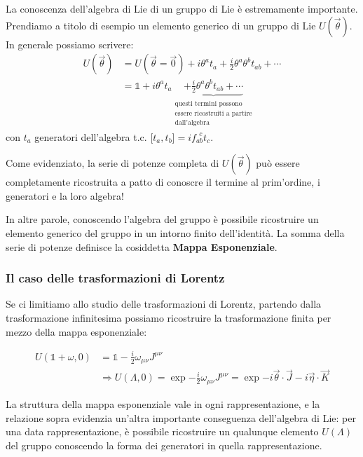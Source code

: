 \documentclass[../main.tex]{subfiles}
\begin{document}
La conoscenza dell'algebra di Lie di un gruppo di Lie è estremamente importante. Prendiamo a titolo di esempio un elemento generico di un gruppo di Lie $U(\Vec\theta)$. In generale possiamo scrivere:
\begin{align*}
    U(\Vec\theta) &= U(\Vec\theta=\Vec0) + i\theta^a t_a + \frac{i}{2}\theta^a \theta^b t_{ab} + \cdots\\
    &=\mathbb 1 + i\theta^a t_a \underbrace{+ \frac{i}{2}\theta^a \theta^b t_{ab} + \cdots}_{\substack{\text{questi termini possono}\\\text{essere ricostruiti a partire}\\\text{dall'algebra}}}
\end{align*}
con \(t_a\) generatori dell'algebra t.c. \(\big[t_a,t_b\big] = if_{ab}^{~~c}t_c\).

Come evidenziato, la serie di potenze completa di $U(\Vec\theta)$ può essere completamente ricostruita a patto di conoscre il termine al prim'ordine, i generatori e la loro algebra!

In altre parole, conoscendo l'algebra del gruppo è possibile ricostruire un elemento generico del gruppo in un intorno finito dell'identità. La somma della serie di potenze definisce la cosiddetta \textbf{Mappa Esponenziale}.

\subsubsection{Il caso delle trasformazioni di Lorentz}

Se ci limitiamo allo studio delle trasformazioni di Lorentz, partendo dalla trasformazione infinitesima possiamo ricostruire la trasformazione finita per mezzo della mappa esponenziale:

\begin{align*}
    U(\mathbb 1 + \omega, 0) &= \mathbb 1 - \frac{i}{2}\omega_{\mu\nu}J^{\mu\nu} \\
    &\Rightarrow \boxed{U(\Lambda, 0) = \exp{- \frac{i}{2}\omega_{\mu\nu}J^{\mu\nu}} = \exp{-i\Vec{\theta}\cdot \Vec{J} - i \Vec{\eta}\cdot\Vec{K}} }
\end{align*}

La struttura della mappa esponenziale vale in ogni rappresentazione, e la relazione sopra evidenzia un'altra importante conseguenza dell'algebra di Lie: per una data rappresentazione, è possibile ricostruire un qualunque elemento $U(\Lambda)$ del gruppo conoscendo la forma dei generatori in quella rappresentazione.
\end{document}
